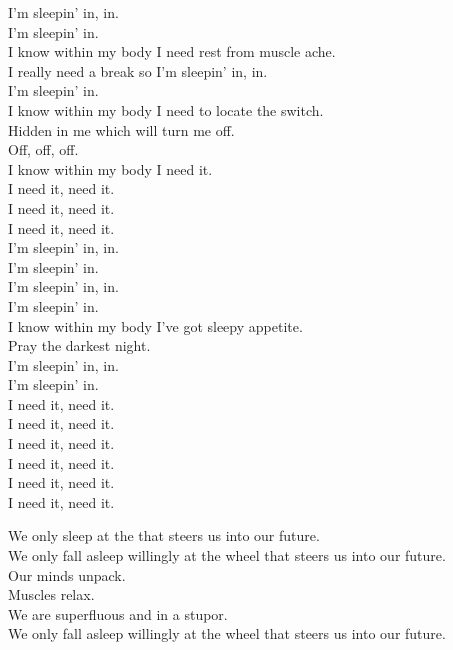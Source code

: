 


I'm sleepin' in, in. \\
I'm sleepin' in. \\
I know within my body I need rest from muscle ache. \\
I really need a break so I'm sleepin' in, in. \\
I'm sleepin' in. \\
I know within my body I need to locate the switch. \\
Hidden in me which will turn me off. \\
Off, off, off. \\
I know within my body I need it. \\

I need it, need it. \\
I need it, need it. \\
I need it, need it. \\

I'm sleepin' in, in. \\
I'm sleepin' in. \\
I'm sleepin' in, in. \\
I'm sleepin' in. \\
I know within my body I've got sleepy appetite. \\
Pray the darkest night. \\
I'm sleepin' in, in. \\
I'm sleepin' in. \\

I need it, need it. \\
I need it, need it. \\
I need it, need it. \\
I need it, need it. \\
I need it, need it. \\
I need it, need it. \\




We only sleep at the  that steers us into our future. \\
We only fall asleep willingly at the wheel that steers us into our future. \\
Our minds unpack. \\
Muscles relax. \\
We are superfluous and in a stupor. \\
We only fall asleep willingly at the wheel that steers us into our future. \\

